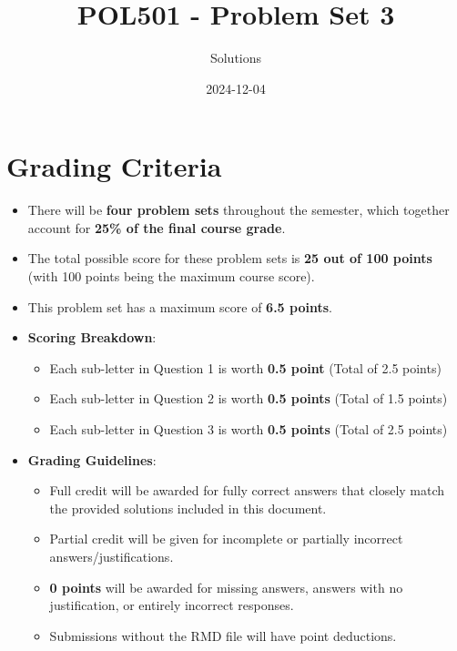 \documentclass[
  11pt,
]{article}
\title{POL501 - Problem Set 3}
\author{Solutions}
\date{2024-12-04}
\providecommand{\tightlist}{%
  \setlength{\itemsep}{0pt}\setlength{\parskip}{0pt}}
\begin{document}
\maketitle

{
\setcounter{tocdepth}{2}
\tableofcontents
}
\newpage

\section{Grading Criteria}\label{grading-criteria}

\begin{itemize}
\tightlist
\item
  There will be \textbf{four problem sets} throughout the semester,
  which together account for \textbf{25\% of the final course grade}.
\item
  The total possible score for these problem sets is \textbf{25 out of
  100 points} (with 100 points being the maximum course score).
\item
  This problem set has a maximum score of \textbf{6.5 points}.
\item
  \textbf{Scoring Breakdown}:

  \begin{itemize}
  \tightlist
  \item
    Each sub-letter in Question 1 is worth \textbf{0.5 point} (Total of
    2.5 points)
  \item
    Each sub-letter in Question 2 is worth \textbf{0.5 points} (Total of
    1.5 points)
  \item
    Each sub-letter in Question 3 is worth \textbf{0.5 points} (Total of
    2.5 points)
  \end{itemize}
\item
  \textbf{Grading Guidelines}:

  \begin{itemize}
  \tightlist
  \item
    Full credit will be awarded for fully correct answers that closely
    match the provided solutions included in this document.
  \item
    Partial credit will be given for incomplete or partially incorrect
    answers/justifications.
  \item
    \textbf{0 points} will be awarded for missing answers, answers with
    no justification, or entirely incorrect responses.
  \item
    Submissions without the RMD file will have point deductions.
  \end{itemize}
\end{itemize}
\end{document}
